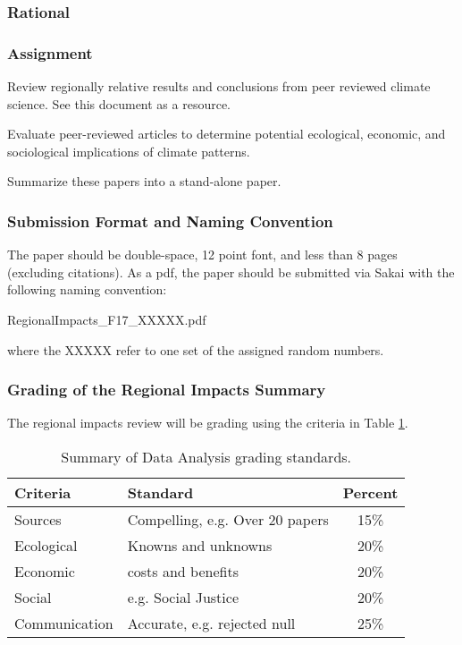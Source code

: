 
\subsubsection{Rational}

\subsubsection{Assignment}

Review regionally relative results and conclusions from peer reviewed climate science. See this document as a resource.

Evaluate peer-reviewed articles to determine potential ecological, economic, and sociological implications of climate patterns.

Summarize these papers into a stand-alone paper. 

\subsubsection{Submission Format and Naming Convention}

The paper should be double-space, 12 point font, and less than 8 pages (excluding citations). As a pdf, the paper should be submitted via Sakai with the following naming convention:

\medskip
RegionalImpacts\_F17\_XXXXX.pdf

\medskip \noindent where the XXXXX refer to one set of the assigned random numbers. 

\subsubsection{Grading of the Regional Impacts Summary}

The regional impacts review will be grading using the criteria in Table \ref{tab:regionalimpactsgrading}.

\begin{table}[h]
\caption{Summary of Data Analysis grading standards.}
\label{tab:regionalimpactsgrading}
\begin{tabular}{llc}\hline
Criteria            &   Standard    & Percent \\ \hline\hline
Sources     & Compelling, e.g. Over 20 papers & 15\% \\
Ecological  & Knowns and unknowns             & 20\% \\
Economic    & costs and benefits              & 20\% \\
Social      & e.g. Social Justice             & 20\% \\
Communication    & Accurate, e.g. rejected null   & 25\% \\

\hline
\end{tabular}
\end{table}